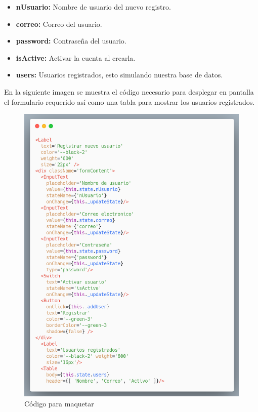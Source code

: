   \begin{itemize}
   \item \textbf{ nUsuario:} Nombre de usuario del nuevo registro.
   \item \textbf{ correo:} Correo del usuario.
   \item \textbf{ password:} Contraseña del usuario.
   \item \textbf{ isActive:} Activar la cuenta al crearla.
   \item \textbf{ users:} Usuarios registrados, esto simulando nuestra base de datos.
  \end{itemize}

En la siguiente imagen se muestra el código necesario para desplegar en pantalla el formulario requerido así como una tabla para mostrar los usuarios registrados.

\newline
\begin{figure}[H]
    \includegraphics[width=1\textwidth]{./Imagenes/9.8}
   \centering 
    \caption[Código para maquetar]{Código para maquetar}
    \end{figure}
\newline

